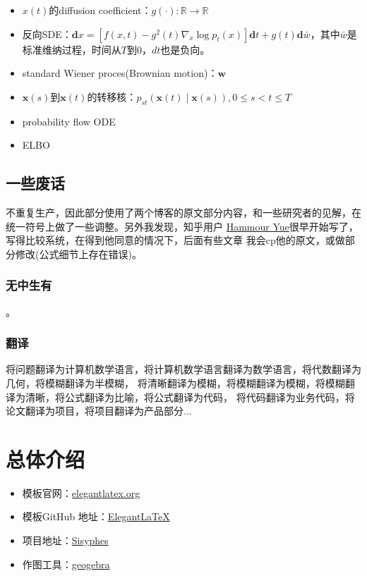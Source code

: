 \documentclass[lang=cn,newtx,10pt,scheme=chinese]{elegantbook}
\begin{document}
\begin{itemize}
    \item $x(t)$的diffusion coefficient：$g(\cdot):\mathbb{R} \rightarrow \mathbb{R}$
    \item 反向SDE：$\mathbf{d} x=\left[f(x, t)-g^2(t) \nabla_x \log p_t(x)\right] \mathbf{d} t+g(t) \mathbf{d} \bar{w}$，其中$\bar{w}$是标准维纳过程，时间从$T$到$0$，$dt$也是负向。
    \item standard Wiener proces(Brownian motion)：$\boldsymbol{w}$
    \item $\mathbf{x}(s)$到$\mathbf{x}(t)$的转移核：$p_{s t}(\mathbf{x}(t) \mid \mathbf{x}(s)),0 \leqslant s<t \leqslant T$
    \item probability flow ODE
    \item ELBO 

\end{itemize}
\section{一些废话}
不重复生产，因此部分使用了两个博客的原文部分内容，和一些研究者的见解，在统一符号上做了一些调整。另外我发现，知乎用户
\href{https://www.zhihu.com/people/bai-e-ji-wan-qi}{Hammour Yue}很早开始写了，写得比较系统，在得到他同意的情况下，后面有些文章
我会cp他的原文，或做部分修改(公式细节上存在错误)。
\subsection{无中生有}
。
\subsection{翻译}
将问题翻译为计算机数学语言，将计算机数学语言翻译为数学语言，将代数翻译为几何，将模糊翻译为半模糊，
将清晰翻译为模糊，将模糊翻译为模糊，将模糊翻译为清晰，将公式翻译为比喻，将公式翻译为代码，
将代码翻译为业务代码，将论文翻译为项目，将项目翻译为产品部分...

\chapter{总体介绍}

\begin{itemize}
  \item 模板官网：\href{https://elegantlatex.org/}{elegantlatex.org}
  \item 模板GitHub 地址：\href{https://github.com/ElegantLaTeX/}{ElegantLaTeX}
  \item 项目地址：\href{https://github.com/foocker/AIGC}{Sisyphes}
  \item 作图工具：\href{https://www.geogebra.org/?lang=en}{geogebra}
\end{itemize}
\end{document}
